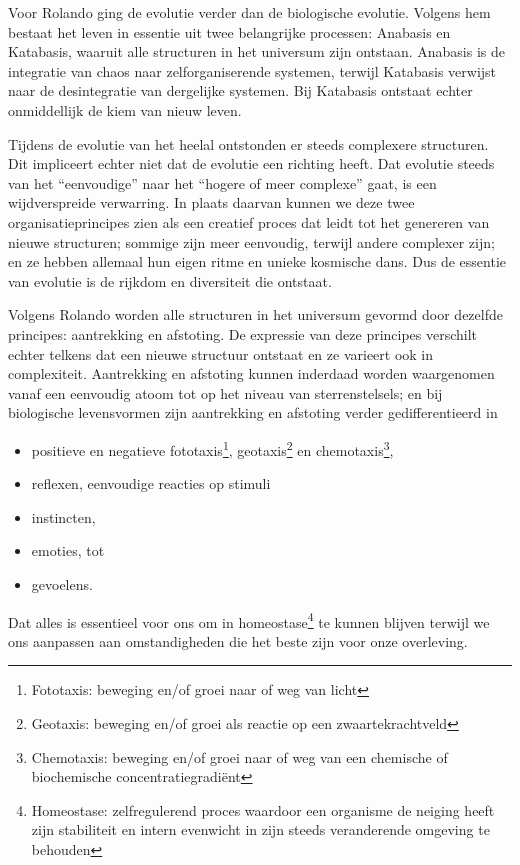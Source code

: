 \documentclass[
  11pt,
]{book}
\providecommand{\tightlist}{%
  \setlength{\itemsep}{0pt}\setlength{\parskip}{0pt}}
\begin{document}
Voor Rolando ging de evolutie verder dan de biologische evolutie. Volgens hem bestaat het leven in essentie uit twee belangrijke processen: Anabasis en Katabasis, waaruit alle structuren in het universum zijn ontstaan. Anabasis is de integratie van chaos naar zelforganiserende systemen, terwijl Katabasis verwijst naar de desintegratie van dergelijke systemen. Bij Katabasis ontstaat echter onmiddellijk de kiem van nieuw leven.

Tijdens de evolutie van het heelal ontstonden er steeds complexere structuren. Dit impliceert echter niet dat de evolutie een richting heeft. Dat evolutie steeds van het ``eenvoudige'' naar het ``hogere of meer complexe'' gaat, is een wijdverspreide verwarring. In plaats daarvan kunnen we deze twee organisatieprincipes zien als een creatief proces dat leidt tot het genereren van nieuwe structuren; sommige zijn meer eenvoudig, terwijl andere complexer zijn; en ze hebben allemaal hun eigen ritme en unieke kosmische dans. Dus de essentie van evolutie is de rijkdom en diversiteit die ontstaat.

Volgens Rolando worden alle structuren in het universum gevormd door dezelfde principes: aantrekking en afstoting. De expressie van deze principes verschilt echter telkens dat een nieuwe structuur ontstaat en ze varieert ook in complexiteit. Aantrekking en afstoting kunnen inderdaad worden waargenomen vanaf een eenvoudig atoom tot op het niveau van sterrenstelsels; en bij biologische levensvormen zijn aantrekking en afstoting verder gedifferentieerd in

\begin{itemize}
\tightlist
\item
  positieve en negatieve fototaxis\footnote{Fototaxis: beweging en/of groei naar of weg van licht}, geotaxis\footnote{Geotaxis: beweging en/of groei als reactie op een zwaartekrachtveld} en chemotaxis\footnote{Chemotaxis: beweging en/of groei naar of weg van een chemische of biochemische concentratiegradiënt},
\item
  reflexen, eenvoudige reacties op stimuli
\item
  instincten,
\item
  emoties, tot
\item
  gevoelens.
\end{itemize}

Dat alles is essentieel voor ons om in homeostase\footnote{Homeostase: zelfregulerend proces waardoor een organisme de neiging heeft zijn stabiliteit en intern evenwicht in zijn steeds veranderende omgeving te behouden} te kunnen blijven terwijl we ons aanpassen aan omstandigheden die het beste zijn voor onze overleving.
\end{document}
